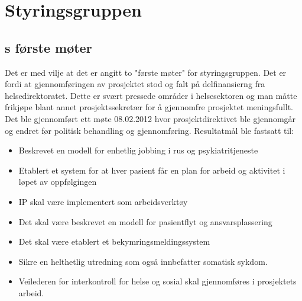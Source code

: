 \documentclass[11pt]{report} %
\begin{document}
                \section{Styringsgruppen}\label{sec:m_stygr}
                  \subsection{s første møter}\label{sec:stygr_1}
                 Det er med vilje at det er angitt to "første møter" for styringsgruppen. Det er fordi at gjennomføringen av prosjektet stod og falt på delfinansierng fra helsedirektoratet. Dette er svært pressede områder i helsesektoren og man måtte frikjøpe blant annet prosjektssekretær for å gjennomfre prosjektet meningsfullt. \\
                 Det ble gjennomført ett møte 08.02.2012 hvor prosjektdirektivet\cite{ProPlan-1} ble gjennomgår og endret før politisk behandling og gjennomføring. Resultatmål ble fastsatt til:
                  \begin{itemize}
                  \item Beskrevet en modell for enhetlig jobbing i rus og psykiatritjeneste\\
                  \item Etablert et system for at hver pasient får en plan for arbeid og aktivitet i løpet av oppfølgingen\\
                  \item IP skal være implementert som arbeidsverktøy\\
                  \item Det skal være beskrevet en modell for pasientflyt og ansvarsplassering\\
                  \item Det skal være etablert et bekymringsmeldingssystem\\
                  \item Sikre en helthetlig utredning som også innbefatter somatisk sykdom.\\
                  \item Veilederen for interkontroll for helse og sosial skal gjennomføres i prosjektets arbeid.\\
                  \end{itemize}
\end{document}
